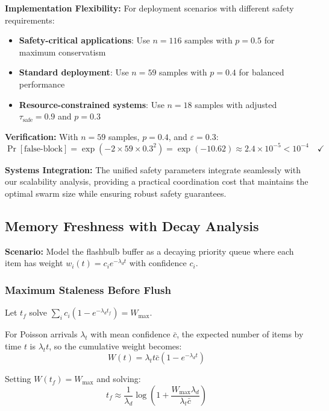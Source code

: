 \documentclass{article}
\begin{document}
\textbf{Implementation Flexibility:} For deployment scenarios with different safety requirements:
\begin{itemize}
\item \textbf{Safety-critical applications}: Use $n = 116$ samples with $p = 0.5$ for maximum conservatism
\item \textbf{Standard deployment}: Use $n = 59$ samples with $p = 0.4$ for balanced performance
\item \textbf{Resource-constrained systems}: Use $n = 18$ samples with adjusted $\tau_{\text{safe}} = 0.9$ and $p = 0.3$
\end{itemize}

\textbf{Verification:} With $n = 59$ samples, $p = 0.4$, and $\varepsilon = 0.3$:
\begin{equation}
\Pr[\text{false-block}] = \exp(-2 \times 59 \times 0.3^2) = \exp(-10.62) \approx 2.4 \times 10^{-5} < 10^{-4} \quad \checkmark
\end{equation}

\textbf{Systems Integration:} The unified safety parameters integrate seamlessly with our scalability analysis, providing a practical coordination cost that maintains the optimal swarm size while ensuring robust safety guarantees.

\subsection{Memory Freshness with Decay Analysis}

\textbf{Scenario:} Model the flashbulb buffer as a decaying priority queue where each item has weight $w_i(t) = c_i e^{-\lambda_d t}$ with confidence $c_i$.

\subsubsection{Maximum Staleness Before Flush}

Let $t_f$ solve $\sum_i c_i(1 - e^{-\lambda_d t_f}) = W_{\max}$.

For Poisson arrivals $\lambda_t$ with mean confidence $\bar{c}$, the expected number of items by time $t$ is $\lambda_t t$, so the cumulative weight becomes:
\begin{equation}
W(t) = \lambda_t t \bar{c}(1 - e^{-\lambda_d t})
\end{equation}

Setting $W(t_f) = W_{\max}$ and solving:
\begin{equation}
t_f \approx \frac{1}{\lambda_d} \log\left(1 + \frac{W_{\max}\lambda_d}{\lambda_t \bar{c}}\right)
\end{equation}
\end{document}
